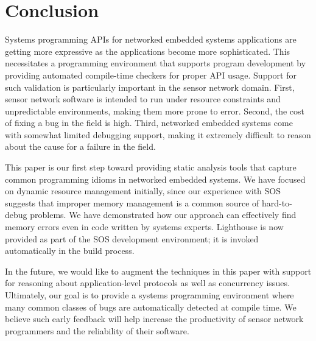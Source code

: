 \section{Conclusion}
\label{sec:conc}

Systems programming APIs for networked embedded systems applications
are getting more expressive as the applications become more
sophisticated.  This necessitates a programming environment that
supports program development by providing automated compile-time
checkers for proper API usage.  Support for such validation is
particularly important in the sensor network domain.  First,
sensor network software is intended to run under resource constraints
and unpredictable environments, making them more prone to error.
Second, the cost of fixing a bug in the field is
high.  Third, networked embedded systems come with somewhat limited
debugging support, making it extremely difficult to reason about the
cause for a failure in the field.

This paper is our first step toward providing static analysis tools
that capture common programming idioms in networked embedded systems.
We have focused on dynamic resource management initially, since our
experience with SOS suggests that improper memory management is a
common source of hard-to-debug problems.  We have demonstrated how our
approach can effectively find memory errors even in code written by
systems experts.  Lighthouse is now provided as part of the
SOS development environment; it is invoked automatically in the build
process.

In the future, we would like to augment the techniques in this paper
with support for reasoning about application-level protocols
\cite{AlurPOPL05,HJM05} as well as concurrency issues.  Ultimately,
our goal is to provide a systems programming environment where many
common classes of bugs are automatically detected at compile time.  We
believe such early feedback will help increase the productivity of
sensor network programmers and the reliability of their software.


